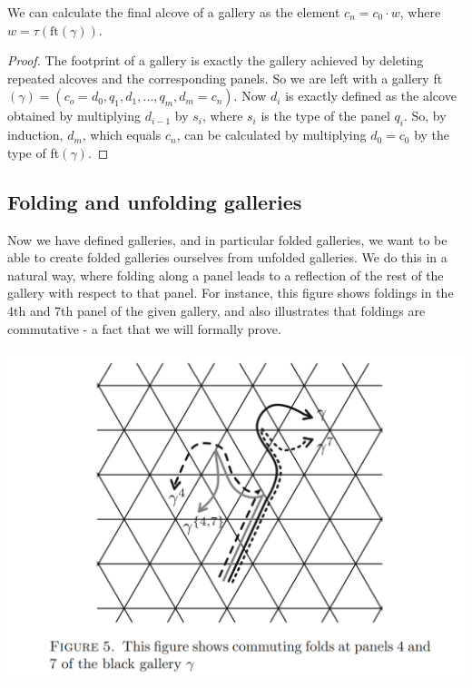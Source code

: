 \documentclass[11pt]{article}
\begin{document}
\begin{lemma}
    We can calculate the final alcove of a gallery as the element $c_n=c_0\cdot w$, where $w=\tau(\text{ft}(\gamma))$.
\end{lemma}

\begin{proof}
    The footprint of a gallery is exactly the gallery achieved by deleting repeated alcoves and the corresponding panels. So we are left with a gallery ft$(\gamma)=(c_o=d_0,q_1,d_1,...,q_m,d_m=c_n)$. Now $d_i$ is exactly defined as the alcove obtained by multiplying $d_{i-1}$ by $s_i$, where $s_i$ is the type of the panel $q_i$. So, by induction, $d_m$, which equals $c_n$, can be calculated by multiplying $d_0=c_0$ by the type of ft$(\gamma)$. 
\end{proof}

\subsection{Folding and unfolding galleries}

Now we have defined galleries, and in particular folded galleries, we want to be able to create folded galleries ourselves from unfolded galleries. We do this in a natural way, where folding along a panel leads to a reflection of the rest of the gallery with respect to that panel. For instance, this figure shows foldings in the 4th and 7th panel of the given gallery, and also illustrates that foldings are commutative - a fact that we will formally prove.

\includegraphics[scale=0.6]{Screenshot 2023-02-03 153412.png}\\
\end{document}
